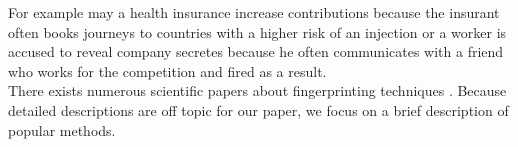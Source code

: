 \documentclass[article,colorback,accentcolor=tud9c,type=bsc]{tudthesis}
\begin{document}
	For example may a health insurance increase contributions because the insurant often books journeys to countries with a higher risk of an injection or a worker is accused to reveal company secretes because he often communicates with a friend who works for the competition and fired as a result. \\
	
	
	
	
	There exists numerous scientific papers about fingerprinting techniques \cite{paulstone_historysniffing, MBYS11, Nikiforakis:2013:CME:2497621.2498133, Eckersley:2010:UYW:1881151.1881152, MS12, olejnik:hal-00747841}. Because detailed descriptions are off topic for our paper, we focus on a brief description of popular methods. 
	
\end{document}
